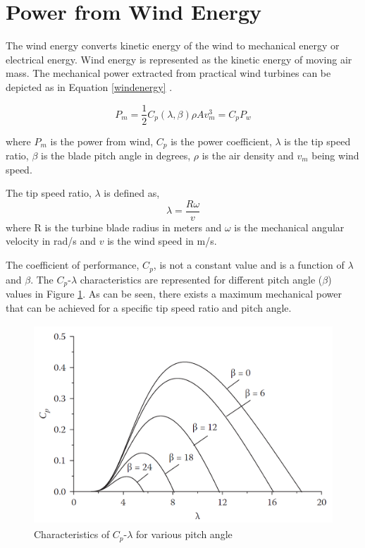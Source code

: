 \section{Power from Wind Energy} 
The wind energy converts kinetic energy of the wind to mechanical energy or electrical energy. Wind energy is represented as the kinetic energy of moving air mass. The mechanical power extracted from practical wind turbines can be depicted as in Equation \ref{windenergy} \cite{ali_wind_2012}.

\begin{equation}\label{windenergy}
    P_m =\frac{1}{2} C_p(\lambda,\beta) \rho A v_m^3 = C_p P_w
\end{equation}

where $P_m$ is the power from wind, $C_p$ is the power coefficient, $\lambda$ is the tip speed ratio, $\beta$ is the blade pitch angle in degrees, $\rho$ is the air density and $v_m$ being wind speed. 

The tip speed ratio, $\lambda$ is defined as,
\begin{equation}
\lambda= \frac{R\omega}{v} 
\end{equation}
where R is the turbine blade radius in meters and $\omega$ is the mechanical angular velocity in rad/s and $v$ is the wind speed in m/s.    

The coefficient of performance, $C_p$, is not a constant value and is a function of $\lambda$ and $\beta$. The $C_p$-$\lambda$ characteristics are represented for different pitch angle ($\beta$) values in Figure \ref{fig:pitchangle}. As can be seen, there exists a maximum mechanical power that can be achieved for a specific tip speed ratio and pitch angle.

\begin{figure}[H]
\centering
    \includegraphics[height = 7.5cm,width = 11.5cm]{Diagrams/Chapter_2/pitchangle_1.png}
    \caption{Characteristics of $C_p$-$\lambda$ for various pitch angle \cite{ali_wind_2012}}
    \label{fig:pitchangle}
\end{figure}

